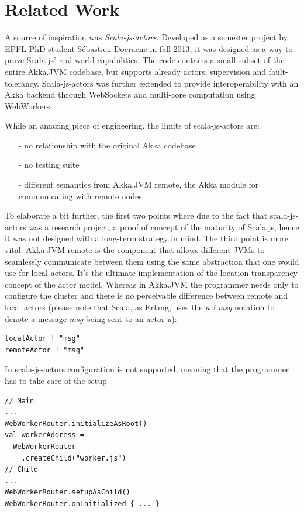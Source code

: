 \documentclass{sig-alternate}
\begin{document}
\section{Related Work}


A source of inspiration was \textit{Scala-js-actors}.
Developed as a semester project by EPFL PhD student Sébastien Doeraene in fall 2013, it was designed as a way to prove Scala-js' real world capabilities.
The code contains a small subset of the entire Akka.JVM codebase, but supports already actors, supervision and fault-tolerancy.
Scala-js-actors was further extended to provide interoperability with an Akka backend through WebSockets and multi-core computation using WebWorkers.


While an amazing piece of engineering, the limits of scala-js-actors are:
\begin{itemize}
\item[-] no relationship with the original Akka codebase
\item[-] no testing suite
\item[-] different semantics from Akka.JVM remote, the Akka module for communicating with remote nodes
\end{itemize}
To elaborate a bit further, the first two points where due to the fact that scala-js-actors was a research project, a proof of concept of the maturity of Scala.js, hence it was not designed with a long-term strategy in mind.
The third point is more vital. Akka.JVM remote is the component that allows different JVMs to seamlessly communicate between them using the same abstraction that one would use for local actors. It's the ultimate implementation of the location transparency concept of the actor model.
Whereas in Akka.JVM the programmer needs only to configure the cluster and there is no perceivable difference between 
remote and local actors (please note that Scala, as Erlang, uses the \emph{a ! msg} notation to denote a message \emph{msg}
being sent to an actor \emph{a}):
\begin{lstlisting}
localActor ! "msg"
remoteActor ! "msg"
\end{lstlisting}
In scala-js-actors configuration is not supported, meaning that the programmer has to take care of the setup
\begin{lstlisting}
// Main
...
WebWorkerRouter.initializeAsRoot()
val workerAddress = 
  WebWorkerRouter
    .createChild("worker.js")
// Child
...
WebWorkerRouter.setupAsChild()
WebWorkerRouter.onInitialized { ... }
\end{lstlisting}
\end{document}

